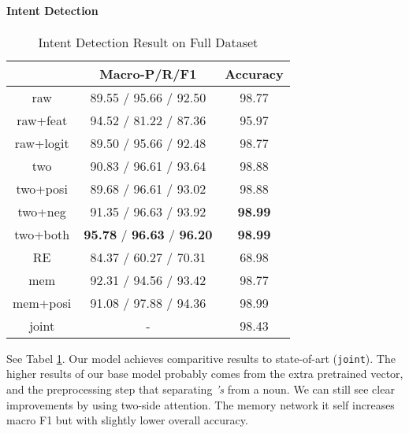 \paragraph{Intent Detection}

\begin{table}
\setlength{\tabcolsep}{0.23em}
\centering
\small{
\begin{tabular}{|c|c|c|}

\hline
  & Macro-P/R/F1 & Accuracy  \\
\hline
raw & 89.55 / 95.66 / 92.50 & 98.77  \\
\hline
raw+feat & 94.52 / 81.22 / 87.36 & 95.97  \\
\hline
raw+logit & 89.50 / 95.66 / 92.48 & 98.77  \\
\hline
two & 90.83 / 96.61 / 93.64 & 98.88 \\
\hline
two+posi & 89.68 / 96.61 / 93.02 & 98.88 \\
\hline
two+neg & 91.35 / 96.63 / 93.92 & \textbf{98.99} \\
\hline
two+both & \textbf{95.78} / \textbf{96.63} / \textbf{96.20} & \textbf{98.99} \\
\hline
\hline
RE & 84.37 / 60.27 / 70.31 & 68.98 \\
\hline
mem & 92.31 / 94.56 / 93.42 & 98.77 \\
\hline
mem+posi & 91.08 / 97.88 / 94.36 & 98.99 \\
\hline
joint & - & 98.43 \\
\hline 

\end{tabular}
}
\caption{Intent Detection Result on Full Dataset}
\label{tab_intent_full}
\end{table}

See Tabel \ref{tab_intent_full}.
Our model achieves comparitive results to state-of-art (\texttt{joint}). The higher results of our base model probably comes from the extra pretrained vector, and the preprocessing step that separating \emph{'s} from a noun. We can still see clear improvements by using two-side attention. The memory network it self increases macro F1 but with slightly lower overall accuracy. 


